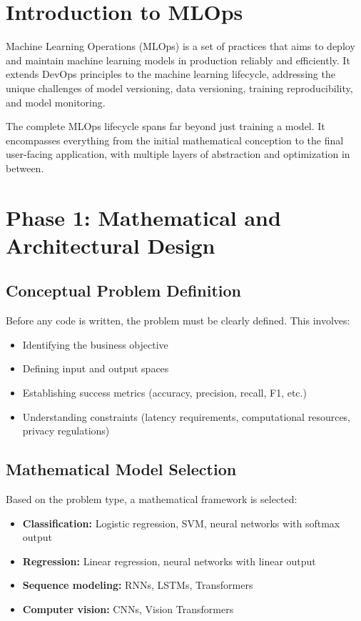 \documentclass[11pt]{article}
\begin{document}
\section{Introduction to MLOps}

Machine Learning Operations (MLOps) is a set of practices that aims to deploy and maintain machine learning models in production reliably and efficiently. It extends DevOps principles to the machine learning lifecycle, addressing the unique challenges of model versioning, data versioning, training reproducibility, and model monitoring.

The complete MLOps lifecycle spans far beyond just training a model. It encompasses everything from the initial mathematical conception to the final user-facing application, with multiple layers of abstraction and optimization in between.

\section{Phase 1: Mathematical and Architectural Design}

\subsection{Conceptual Problem Definition}
Before any code is written, the problem must be clearly defined. This involves:
\begin{itemize}
    \item Identifying the business objective
    \item Defining input and output spaces
    \item Establishing success metrics (accuracy, precision, recall, F1, etc.)
    \item Understanding constraints (latency requirements, computational resources, privacy regulations)
\end{itemize}

\subsection{Mathematical Model Selection}
Based on the problem type, a mathematical framework is selected:
\begin{itemize}
    \item \textbf{Classification:} Logistic regression, SVM, neural networks with softmax output
    \item \textbf{Regression:} Linear regression, neural networks with linear output
    \item \textbf{Sequence modeling:} RNNs, LSTMs, Transformers
    \item \textbf{Computer vision:} CNNs, Vision Transformers
\end{itemize}
\end{document}
